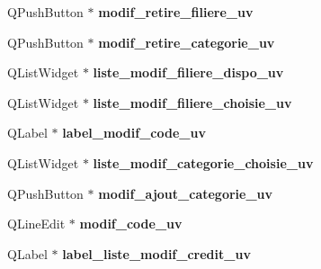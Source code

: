 \begin{DoxyCompactItemize}
\item 
\hypertarget{class_ui___administration_a08ae8577a509753090411bda2d027721}{Q\+Push\+Button $\ast$ {\bfseries modif\+\_\+retire\+\_\+filiere\+\_\+uv}}\label{class_ui___administration_a08ae8577a509753090411bda2d027721}

\item 
\hypertarget{class_ui___administration_a194fe648123ff97c747e1f0bc50500bb}{Q\+Push\+Button $\ast$ {\bfseries modif\+\_\+retire\+\_\+categorie\+\_\+uv}}\label{class_ui___administration_a194fe648123ff97c747e1f0bc50500bb}

\item 
\hypertarget{class_ui___administration_ac36705a8886190816046baf1f07d613b}{Q\+List\+Widget $\ast$ {\bfseries liste\+\_\+modif\+\_\+filiere\+\_\+dispo\+\_\+uv}}\label{class_ui___administration_ac36705a8886190816046baf1f07d613b}

\item 
\hypertarget{class_ui___administration_acc3ac68b7c1367210852e273d39a38d4}{Q\+List\+Widget $\ast$ {\bfseries liste\+\_\+modif\+\_\+filiere\+\_\+choisie\+\_\+uv}}\label{class_ui___administration_acc3ac68b7c1367210852e273d39a38d4}

\item 
\hypertarget{class_ui___administration_abed8cfc5634e86eb20bd68f2e7a3b443}{Q\+Label $\ast$ {\bfseries label\+\_\+modif\+\_\+code\+\_\+uv}}\label{class_ui___administration_abed8cfc5634e86eb20bd68f2e7a3b443}

\item 
\hypertarget{class_ui___administration_a682037bd2afff1d11bfa21be7e77af10}{Q\+List\+Widget $\ast$ {\bfseries liste\+\_\+modif\+\_\+categorie\+\_\+choisie\+\_\+uv}}\label{class_ui___administration_a682037bd2afff1d11bfa21be7e77af10}

\item 
\hypertarget{class_ui___administration_a6f33d9e0cb967253ae84f507e9d142b5}{Q\+Push\+Button $\ast$ {\bfseries modif\+\_\+ajout\+\_\+categorie\+\_\+uv}}\label{class_ui___administration_a6f33d9e0cb967253ae84f507e9d142b5}

\item 
\hypertarget{class_ui___administration_aab2789c74d640ad7721687cdc7490fc7}{Q\+Line\+Edit $\ast$ {\bfseries modif\+\_\+code\+\_\+uv}}\label{class_ui___administration_aab2789c74d640ad7721687cdc7490fc7}

\item 
\hypertarget{class_ui___administration_a387f11cd3b37bcacaab2c726fdadb711}{Q\+Label $\ast$ {\bfseries label\+\_\+liste\+\_\+modif\+\_\+credit\+\_\+uv}}\label{class_ui___administration_a387f11cd3b37bcacaab2c726fdadb711}


\end{DoxyCompactItemize}

